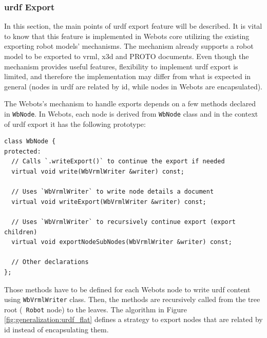 \subsubsection{\ac{urdf} Export}
\label{subsub:generalization:urdf_export}

In this section, the main points of \ac{urdf} export feature will be described.
It is vital to know that this feature is implemented in Webots core utilizing the existing exporting robot models' mechanisms.
The mechanism already supports a robot model to be exported to \acs{vrml}, \acs{x3d} and PROTO documents.
Even though the mechanism provides useful features, flexibility to implement \ac{urdf} export is limited, and therefore the implementation may differ from what is expected in general (nodes in \ac{urdf} are related by \acs{id}, while nodes in Webots are encapsulated).

The Webots's mechanism to handle exports depends on a few methods declared in \texttt{WbNode}.
In Webots, each node is derived from \texttt{WbNode} class and in the context of \ac{urdf} export it has the following prototype:
\begin{verbatim}
class WbNode {
protected:
  // Calls `.writeExport()` to continue the export if needed
  virtual void write(WbVrmlWriter &writer) const;

  // Uses `WbVrmlWriter` to write node details a document
  virtual void writeExport(WbVrmlWriter &writer) const;
  
  // Uses `WbVrmlWriter` to recursively continue export (export children)
  virtual void exportNodeSubNodes(WbVrmlWriter &writer) const;
  
  // Other declarations
};
\end{verbatim}

Those methods have to be defined for each Webots node to write \ac{urdf} content using \texttt{WbVrmlWriter} class.
Then, the methods are recursively called from the tree root (\texttt{ Robot} node) to the leaves.
The algorithm in Figure \ref{fig:generalization:urdf_flat} defines a strategy to export nodes that are related by \acs{id} instead of encapsulating them.


